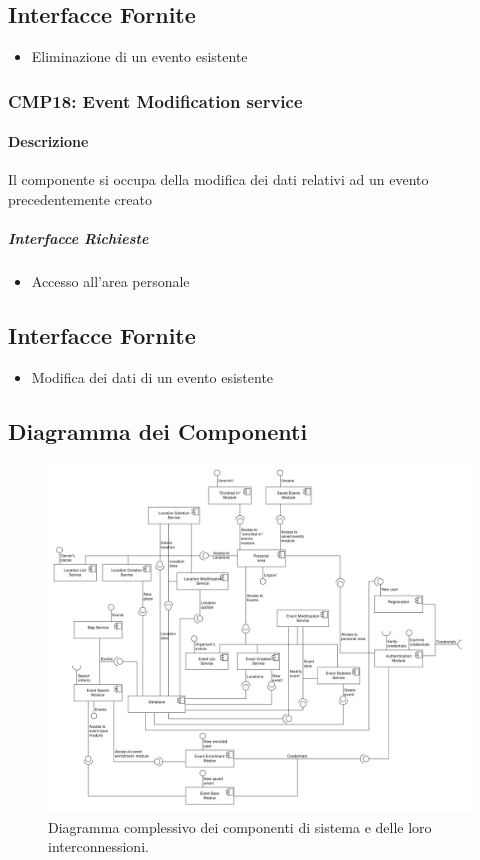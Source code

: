 \documentclass[9pt]{extarticle}
\begin{document}
\subsection{Interfacce Fornite}
\begin{itemize}
	\item Eliminazione di un evento esistente
\end{itemize}

\subsubsection*{CMP18: Event Modification service}
\paragraph{Descrizione}
Il componente si occupa della modifica dei dati relativi ad un evento precedentemente creato
\subparagraph{Interfacce Richieste}
\begin{itemize}
	\item Accesso all'area personale
\end{itemize}
\subsection{Interfacce Fornite}
\begin{itemize}
	\item Modifica dei dati di un evento esistente
\end{itemize}

\subsection{Diagramma dei Componenti}

\begin{figure}[!htb]
	\centering
	\includegraphics[width=\linewidth]{./images/ComponentDiagramV2.pdf}
	\caption{Diagramma complessivo dei componenti di sistema e delle loro interconnessioni.}
	\label{fig:ComponentDiagram}
\end{figure}
\end{document}
